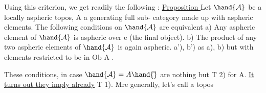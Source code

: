 Using this criterion, we get readily the following :
\uline{Proposition } Let $\hand{\mathcal{A}}$ be a locally aspheric topos, A a generating full sub-%
category made up with aspheric elements. The following conditions on $\hand{\mathcal{A}}$ are 
equivalent\hand{:} 
a) Any aspheric element of $\hand{\mathcal{A}}$ is aspheric over e (the final object).
b) The product of any two aspheric elements of $\hand{\mathcal{A}}$ is again aspheric.
a'), b') as a), b) but with elements restricted to be in Ob A .

These conditions, in case $\hand{\mathcal{A}} = A\hand{\hat{}}$ are nothing but T 2) for A. \uline{It
turns out they imply already} T 1). Mre generally, let's call a topos
